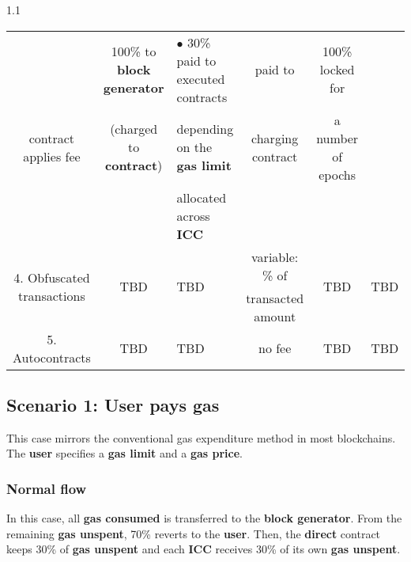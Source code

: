 \documentclass[twocolumn, nofootinbib]{revtex4-2} %
\newcommand{\emphathize}[1]{\textbf{#1}\xspace}
\newcommand{\blockgenerator}{\emphathize{block generator}}
\newcommand{\contract}{\emphathize{contract}}
\newcommand{\direct}{\emphathize{direct}}
\newcommand{\gasprice}{\emphathize{gas price}}
\newcommand{\gaslimit}{\emphathize{gas limit}}
\newcommand{\gasconsumed}{\emphathize{gas consumed}}
\newcommand{\gasunspent}{\emphathize{gas unspent}}
\newcommand{\icc}{\emphathize{ICC}}
\newcommand{\user}{\emphathize{user}}
\begin{document}
\begin{table*}[t]
\begin{spacing}{1.1}
{\begin{tabular}{| c | c | l | c | c | c |}
					& 100\% to \blockgenerator
					& $\bullet$ 30\% paid to executed contracts 
					& paid to
					& 100\% locked for
					& 	
					\\
					contract applies fee
					& (charged to \contract)
					& \hspace{0.2cm} depending on the \gaslimit
					& charging contract
					& a number of epochs
					& 	
					\\
					& 
					& \hspace{0.2cm} allocated across \icc
					& 
					& 
					& 		
					\\ \hline	
					\multirow{2}{*}{4. Obfuscated transactions}
					& \multirow{2}{*}{TBD}
					& \multirow{2}{*}{TBD}
					& variable: \% of
					& \multirow{2}{*}{TBD}
					& \multirow{2}{*}{TBD}
					\\
					
					& 
					&  
					& transacted amount
					& 
					& 	
					\\
					\hline											
					5. Autocontracts
					& TBD
					& TBD
					& no fee
					& TBD
					& TBD
					\\
					\hline		
				\end{tabular}
			}
			\caption{Summary of how gas and fees are handled in each scenario.}
			\label{tab:gas}
		\end{spacing}
	\end{table*}

    \subsection{Scenario 1: User pays gas}\label{sec:specifications:scenario-1}
    This case mirrors the conventional gas expenditure method in most
    blockchains.
    The \user specifies a \gaslimit and a \gasprice.
    
    \subsubsection{Normal flow}\label{sec:specifications:scenario-1:normal-flow}
    
    In this case, all \gasconsumed is transferred to the \blockgenerator. From the remaining \gasunspent, 70\% reverts to the \user. Then, the \direct contract keeps 30\% of \gasunspent and each \icc receives 30\% of its own \gasunspent.
\end{document}
